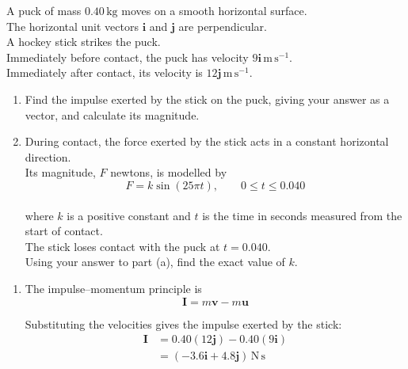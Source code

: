 \documentclass[leqno]{article}
\begin{document}
\djsFrontMatter
\begin{enumerate}[
  label=\textbf{\arabic*.},
  leftmargin=*,
  topsep=0pt,
  partopsep=0pt,
  parsep=0pt
]

\questionitem

A puck of mass $0.40\,\mathrm{kg}$ moves on a smooth horizontal surface. \\
The horizontal unit vectors $\mathbf{i}$ and $\mathbf{j}$ are perpendicular. \\

A hockey stick strikes the puck. \\
Immediately before contact, the puck has velocity $9\mathbf{i}\,\mathrm{m\,s^{-1}}$. \\
Immediately after contact, its velocity is $12\mathbf{j}\,\mathrm{m\,s^{-1}}$. \\
\begin{enumerate}[label=\textbf{(\alph*)}]
\item Find the impulse exerted by the stick on the puck, giving your answer as a vector, and calculate its magnitude.  \\
\item During contact, the force exerted by the stick acts in a constant horizontal direction. \\
Its magnitude, $F$ newtons, is modelled by
\[
F=k\sin(25\pi t),\qquad 0\leq t\leq 0.040
\] \\
where $k$ is a positive constant and $t$ is the time in seconds measured from the start of contact. \\
The stick loses contact with the puck at $t=0.040$. \\
Using your answer to part (a), find the exact value of $k$.  \\
\end{enumerate}

\vspace*{10pt}

\begin{djsSolution}
\begin{enumerate}[label=\textbf{(\alph*)}, start=1]
\item The impulse--momentum principle is
\[
\mathbf{I}=m\mathbf{v}-m\mathbf{u}
\]

Substituting the velocities gives the impulse exerted by the stick:
\begin{align*}
\mathbf{I}&=0.40(12\mathbf{j})-0.40(9\mathbf{i})\\
&=(-3.6\mathbf{i}+4.8\mathbf{j})\,\mathrm{N\,s}
\end{align*}


\end{enumerate}
\end{djsSolution}
\end{enumerate}
\end{document}
